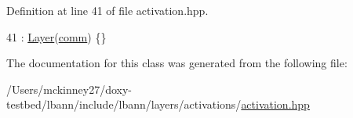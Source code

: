 Definition at line 41 of file activation.\+hpp.


\begin{DoxyCode}
41 : \hyperlink{classlbann_1_1Layer_a24e9c82354a0a2af1b70cbca2211e7d4}{Layer}(\hyperlink{file__io_8cpp_ab048c6f9fcbcfaa57ce68b00263dbebe}{comm}) \{\}
\end{DoxyCode}


The documentation for this class was generated from the following file\+:\begin{DoxyCompactItemize}
\item 
/\+Users/mckinney27/doxy-\/testbed/lbann/include/lbann/layers/activations/\hyperlink{activation_8hpp}{activation.\+hpp}\end{DoxyCompactItemize}
